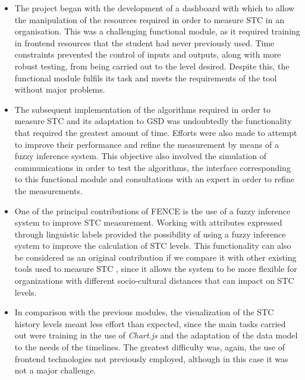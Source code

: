 \begin{itemize}
\item The project began with the development of a dashboard with which to allow the manipulation of the resources required in order to measure STC in an organisation. This was a challenging functional module, as it required training in frontend resources that the student had never previously used. Time constraints prevented the control of inputs and outputs, along with more robust testing, from being carried out to the level desired. Despite this, the functional module fulfils its task and meets the requirements of the tool without major problems.\newline

\item The subsequent implementation of the algorithms required in order to measure STC and its adaptation to GSD was undoubtedly the functionality that required the greatest amount of time. Efforts were also made to attempt to improve their performance and refine the measurement by means of a fuzzy inference system. This objective also involved the simulation of communications in order to test the algorithms, the interface corresponding to this functional module and consultations with an expert in order to refine the measurements.\newline

\item One of the principal contributions of FENCE is the use of a fuzzy inference system to improve STC measurement. Working with attributes expressed through linguistic labels provided the possibility of using a fuzzy inference system to improve the calculation of STC levels. This functionality can also be considered as an original contribution if we compare it with other existing tools used to measure STC \cite{sierra_systematic_2018}, since it allows the system to be more flexible for organizations with different socio-cultural distances that can impact on STC levels.\newline

\item In comparison with the previous modules, the visualization of the STC history levels meant less effort than expected, since the main tasks carried out were training in the use of \emph{Chart.js} and the adaptation of the data model to the needs of the timelines. The greatest difficulty was, again, the use of frontend technologies not previously employed, although in this case it was not a major challenge.\newline


\end{itemize}
